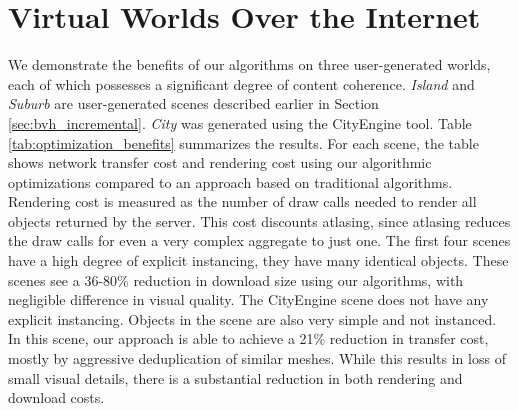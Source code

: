 

\section{Virtual Worlds Over the Internet}
\label{sec:eval}

% 




We demonstrate the benefits of our algorithms on three user-generated
worlds, each of which possesses
a significant degree of content coherence.  
\emph{Island} and \emph{Suburb} are user-generated scenes
described earlier in Section \ref{sec:bvh_incremental}. \emph{City}
was generated using the CityEngine tool. Table \ref{tab:optimization_benefits} summarizes the results.
For each scene, the table shows network transfer cost and rendering
cost using our algorithmic optimizations compared to an approach based on
traditional algorithms. Rendering cost is measured as the number of
draw calls needed to render all objects returned by the server. This
cost discounts atlasing, since atlasing reduces the draw calls for even a very
complex aggregate to just one.
The first four scenes have a high degree of explicit
instancing, \ie they have many identical objects. These scenes see a 36-80\%
reduction in download size using our algorithms, with negligible difference in visual quality.
The CityEngine scene does not
have any explicit instancing. Objects in the scene are also very simple and not
instanced. In this scene, our approach is able to achieve a 21\% reduction in
transfer cost, mostly by aggressive deduplication of similar meshes.
While this results in loss of small visual details, there is a substantial
reduction in both rendering and download costs.

